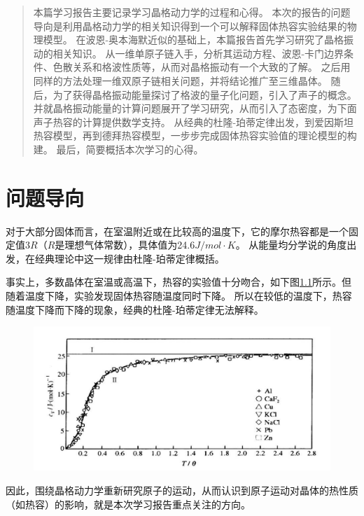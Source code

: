 \documentclass[declarePage]{ecnuthesis}
\begin{document}
\frontmatter

\begin{abstract}
本篇学习报告主要记录学习晶格动力学的过程和心得。
本次的报告的问题导向是利用晶格动力学的相关知识得到一个可以解释固体热容实验结果的物理模型。%
在波恩-奥本海默近似的基础上，本篇报告首先学习研究了晶格振动的相关知识。%
从一维单原子链入手，分析其运动方程、波恩-卡门边界条件、色散关系和格波性质等，从而对晶格振动有一个大致的了解。%
之后用同样的方法处理一维双原子链相关问题，并将结论推广至三维晶体。%
随后，为了获得晶格振动能量探讨了格波的量子化问题，引入了声子的概念。%
并就晶格振动能量的计算问题展开了学习研究，从而引入了态密度，为下面声子热容的计算提供数学支持。%
从经典的杜隆-珀蒂定律出发，到爱因斯坦热容模型，再到德拜热容模型，一步步完成固体热容实验值的理论模型的构建。%
最后，简要概括本次学习的心得。
\end{abstract}



\mainmatter

\chapter{问题导向} 

对于大部分固体而言，在室温附近或在比较高的温度下，它的摩尔热容都是一个固定值$3R$（$R$是理想气体常数），具体值为24.6$J/mol \cdot K$。%
从能量均分学说的角度出发，在经典理论中这一规律由杜隆-珀蒂定律概括。\cite{xxx}

事实上，多数晶体在室温或高温下，热容的实验值十分吻合，如下图\ref{HC}所示。但随着温度下降，实验发现固体热容随温度同时下降。%
所以在较低的温度下，热容随温度下降而下降的现象，经典的杜隆-珀蒂定律无法解释。
\begin{figure}[htb]
    \centering
    \includegraphics[width=.7\textwidth]{HC.png}
    \label{HC}
\end{figure}

因此，围绕晶格动力学重新研究原子的运动，从而认识到原子运动对晶体的热性质（如热容）的影响，就是本次学习报告重点关注的方向。
\end{document}
